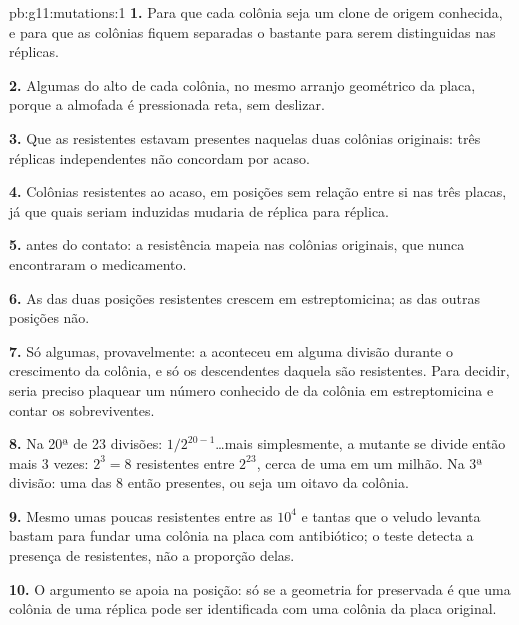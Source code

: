 \begin{solution}{pb:g11:mutations:1}
\textbf{1.} Para que cada colônia seja um clone de origem conhecida, e
para que as colônias fiquem separadas o bastante para serem
distinguidas nas réplicas.

\textbf{2.} Algumas  do alto de cada colônia, no mesmo arranjo
geométrico da placa, porque a almofada é pressionada reta, sem
deslizar.

\textbf{3.} Que as  resistentes estavam presentes naquelas duas
colônias originais: três réplicas independentes não concordam por acaso.

\textbf{4.} Colônias resistentes ao acaso, em posições sem relação
entre si nas três placas, já que quais  seriam induzidas
mudaria de réplica para réplica.

\textbf{5.}  antes do contato: a resistência mapeia nas colônias
originais, que nunca encontraram o medicamento.

\textbf{6.} As  das duas posições resistentes crescem em
estreptomicina; as das outras posições não.

\textbf{7.} Só algumas, provavelmente: a  aconteceu em alguma
divisão durante o crescimento da colônia, e só os descendentes daquela
 são resistentes. Para decidir, seria preciso plaquear um número
conhecido de  da colônia em estreptomicina e contar os
sobreviventes.

\textbf{8.} Na 20ª de 23 divisões: $1/2^{20-1}$\dots mais
simplesmente, a  mutante se divide então mais 3 vezes: $2^3 = 8$
 resistentes entre $2^{23}$, cerca de uma em um milhão. Na 3ª
divisão: uma das 8  então presentes, ou seja um oitavo da colônia.

\textbf{9.} Mesmo umas poucas  resistentes entre as $10^4$ e
tantas que o veludo levanta bastam para fundar uma colônia na placa com
antibiótico; o teste detecta a presença de  resistentes, não a
proporção delas.

\textbf{10.} O argumento se apoia na posição: só se a geometria for
preservada é que uma colônia de uma réplica pode ser identificada com
uma colônia da placa original.


\end{solution}
